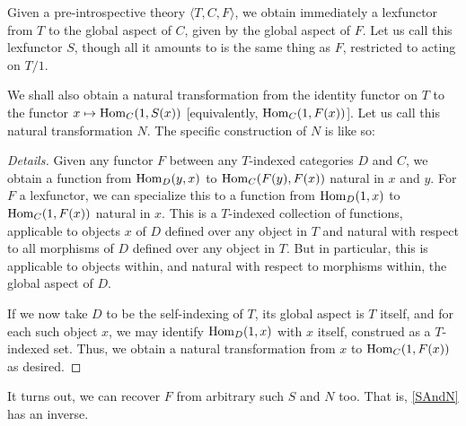 \begin{construction}\label{SAndN}
Given a pre-introspective theory $\langle T, C, F \rangle$, we obtain immediately a lexfunctor from $T$ to the global aspect of $C$, given by the global aspect of $F$. Let us call this lexfunctor $S$, though all it amounts to is the same thing as $F$, restricted to acting on $T/1$.

We shall also obtain a natural transformation from the identity functor on $T$ to the functor $x \mapsto \mathrm{Hom}_C(1, S(x))$ [equivalently, $\mathrm{Hom}_C(1, F(x))$]. Let us call this natural transformation $N$. The specific construction of $N$ is like so:
\end{construction}
\begin{proof}[Details]
Given any functor $F$ between any $T$-indexed categories $D$ and $C$, we obtain a function from $\mathrm{Hom}_D(y, x)$ to $\mathrm{Hom}_C(F(y), F(x))$ natural in $x$ and $y$. For $F$ a lexfunctor, we can specialize this to a function from $\mathrm{Hom}_D(1, x)$ to $\mathrm{Hom}_C(1, F(x))$ natural in $x$. This is a $T$-indexed collection of functions, applicable to objects $x$ of $D$ defined over any object in $T$ and natural with respect to all morphisms of $D$ defined over any object in $T$. But in particular, this is applicable to objects within, and natural with respect to morphisms within, the global aspect of $D$.

If we now take $D$ to be the self-indexing of $T$, its global aspect is $T$ itself, and for each such object $x$, we may identify $\mathrm{Hom}_D(1, x)$ with $x$ itself, construed as a $T$-indexed set. Thus, we obtain a natural transformation from $x$ to $\mathrm{Hom}_C(1, F(x))$ as desired.
\end{proof}

It turns out, we can recover $F$ from arbitrary such $S$ and $N$ too. That is, \cref{SAndN} has an inverse.

